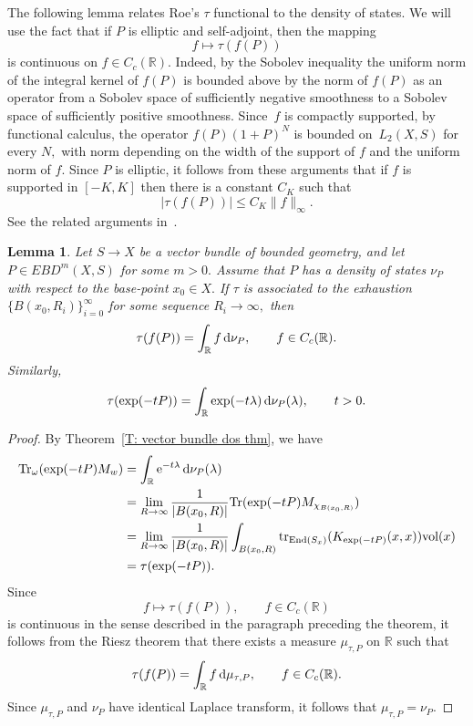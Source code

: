 \documentclass[pdftex]{sigma}
\numberwithin{equation}{section}
\newtheorem{Lemma}[Theorem]{Lemma}
\begin{document}
The following lemma relates Roe's $\tau$ functional to the density of states. We will use the fact that if $P$ is elliptic and self-adjoint, then the mapping
\[
 f\mapsto \tau(f(P))
\]
is continuous on $f \in C_c(\mathbb{R}).$ Indeed, by the Sobolev inequality the uniform norm of the integral kernel of $f(P)$ is bounded above by the norm of $f(P)$ as an operator from a Sobolev space of sufficiently negative smoothness to a Sobolev space of sufficiently positive smoothness. Since~$f$ is compactly supported, by functional calculus, the operator $f(P)(1+P)^N$ is bounded on~$L_2(X,S)$ for every $N,$ with norm depending on the width of the support of $f$ and the uniform norm of $f.$ Since $P$ is elliptic, it follows from these arguments that if $f$
is supported in $[-K,K]$ then there is a constant $C_K$ such that
\[
 |\tau(f(P))| \leq C_K\|f\|_{\infty}.
\]
See the related arguments in~\cite[Propositions 2.9 and~2.10]{Roe1988a}.

\begin{Lemma}\label{L: tau is dos}
 Let $S\to X$ be a vector bundle of bounded geometry,
 and let $P \in EBD^m(X,S)$ for some $m>0.$
 Assume that $P$ has a density of states $\nu_P$
 with respect to the base-point $x_0\in X.$ If $\tau$ is associated to the exhaustion $\{B(x_0,R_i)\}_{i=0}^\infty$ for some sequence $R_i\to\infty,$ then
 \[
 \tau(f(P)) = \int_{\mathbb{R}} f\,{\rm d}\nu_P,\qquad f \in C_c(\mathbb{R}).
 \]
 Similarly,
 \[
 \tau(\exp(-tP)) = \int_{\mathbb{R}} \exp(-t\lambda)\,{\rm d}\nu_P(\lambda),\qquad t > 0.
 \]
\end{Lemma}
\begin{proof}
By Theorem~\ref{T: vector bundle dos thm}, we have
\begin{align*}
\mathrm{Tr}_\omega (\exp(-tP) M_w)&= \int_{\mathbb{R}} {\rm e}^{-t\lambda} \,{\rm d}\nu_P(\lambda)\\
&= \lim_{R\to \infty} \frac{1}{|B(x_0, R)|} \mathrm{Tr}(\exp(-tP)M_{\chi_{B(x_0,R)}})\\
&= \lim_{R\to \infty} \frac{1}{|B(x_0, R)|} \int_{B(x_0,R)}\mathrm{tr}_{\mathrm{End}(S_x)}(K_{\exp(-tP)}(x,x)) \text{vol}(x)\\
&= \tau(\exp(-tP)).
\end{align*}
Since
\[
 f\mapsto \tau(f(P)),\qquad f \in C_c(\mathbb{R})
\]
is continuous in the sense described in the paragraph preceding the theorem, it follows from the Riesz theorem that there exists a measure $\mu_{\tau,P}$ on $\mathbb{R}$ such that
\[
 \tau(f(P)) = \int_{\mathbb{R}} f\,{\rm d}\mu_{\tau,P},\qquad f \in C_c(\mathbb{R}).
\]
Since $\mu_{\tau,P}$ and $\nu_P$ have identical Laplace transform, it follows that $\mu_{\tau,P} = \nu_P.$
\end{proof}
\end{document}
